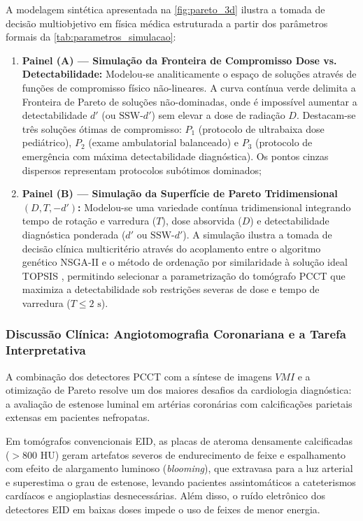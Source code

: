 \documentclass[
  12pt,
  a4paper,
  oneside
]{report}
\begin{document}
A modelagem sintética apresentada na \cref{fig:pareto_3d} ilustra a tomada de decisão multiobjetivo em física médica estruturada a partir dos parâmetros formais da \cref{tab:parametros_simulacao}:
\begin{enumerate}
  \item \textbf{Painel (A) --- Simulação da Fronteira de Compromisso Dose vs. Detectabilidade:}
  Modelou-se analiticamente o espaço de soluções através de funções de compromisso físico não-lineares. A curva contínua verde delimita a Fronteira de Pareto de soluções não-dominadas, onde é impossível aumentar a detectabilidade $d'$ (ou $\text{SSW-}d'$) sem elevar a dose de radiação $D$. Destacam-se três soluções ótimas de compromisso: $P_1$ (protocolo de ultrabaixa dose pediátrico), $P_2$ (exame ambulatorial balanceado) e $P_3$ (protocolo de emergência com máxima detectabilidade diagnóstica). Os pontos cinzas dispersos representam protocolos subótimos dominados;

  \item \textbf{Painel (B) --- Simulação da Superfície de Pareto Tridimensional $(D, T, -d')$:}
  Modelou-se uma variedade contínua tridimensional integrando tempo de rotação e varredura ($T$), dose absorvida ($D$) e detectabilidade diagnóstica ponderada ($d'$ ou $\text{SSW-}d'$). A simulação ilustra a tomada de decisão clínica multicritério através do acoplamento entre o algoritmo genético NSGA-II e o método de ordenação por similaridade à solução ideal TOPSIS \cite{deb2002, hwang1981}, permitindo selecionar a parametrização do tomógrafo PCCT que maximiza a detectabilidade sob restrições severas de dose e tempo de varredura ($T \le 2\text{ s}$).
\end{enumerate}

\subsubsection{Discussão Clínica: Angiotomografia Coronariana e a Tarefa Interpretativa}
A combinação dos detectores PCCT com a síntese de imagens $VMI$ e a otimização de Pareto resolve um dos maiores desafios da cardiologia diagnóstica: a avaliação de estenose luminal em artérias coronárias com calcificações parietais extensas em pacientes nefropatas.

Em tomógrafos convencionais EID, as placas de ateroma densamente calcificadas ($> 800\text{ HU}$) geram artefatos severos de endurecimento de feixe e espalhamento com efeito de alargamento luminoso (\emph{blooming}), que extravasa para a luz arterial e superestima o grau de estenose, levando pacientes assintomáticos a cateterismos cardíacos e angioplastias desnecessárias. Além disso, o ruído eletrônico dos detectores EID em baixas doses impede o uso de feixes de menor energia.
\end{document}
